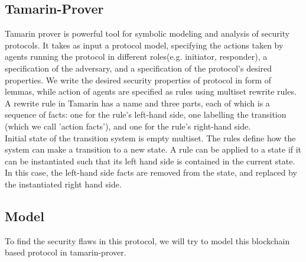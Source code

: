 \documentclass[a4paper]{article}
\begin{document}
\subsection{Tamarin-Prover}
Tamarin prover is powerful tool for symbolic modeling and analysis of security protocols. It takes as input a protocol model, specifying the actions taken by agents running the
protocol in different roles(e.g. initiator, responder), a specification of the adversary, and a specification of the protocol’s desired properties. We write the desired security properties of protocol in form of lemmas, while action of agents are specified as rules using multiset rewrite rules. \\
A rewrite rule in Tamarin has a name and three parts, each of which is a sequence of facts: one for
the rule’s left-hand side, one labelling the transition (which we call 'action facts'), and one for the rule’s right-hand side.\\
Initial state of the transition system is empty multiset. The rules define how the system can make a transition to a new state. A rule can be applied to a state if it can be instantiated such that its left hand side is contained in the current state. In this case, the left-hand side facts are removed from the state, and replaced by the instantiated right hand side.\\

\subsection{Model}
To find the security flaws in this protocol, we will try to model this blockchain based protocol in tamarin-prover.
\end{document}
